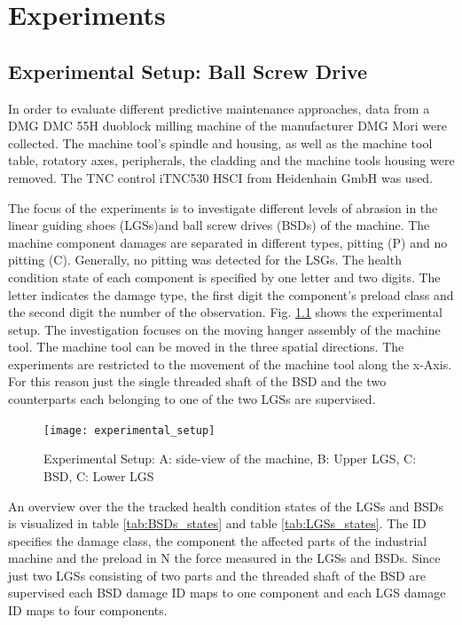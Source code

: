 \chapter{Experiments}\label{chapter:experiments}




\section{Experimental Setup: Ball Screw Drive}
In order to evaluate different predictive maintenance approaches, data from a DMG DMC 55H duoblock milling machine of the manufacturer DMG Mori were collected. The machine tool’s spindle and housing, as well as the machine tool table, rotatory axes, peripherals, the cladding and the machine tools housing were removed. The TNC control iTNC530 HSCI from Heidenhain GmbH was used.

The focus of the experiments is to investigate different levels of abrasion in the linear guiding shoes (LGSs)and ball screw drives (BSDs) of the machine. The machine component damages are separated in different types, pitting (P) and no pitting (C). Generally, no pitting was detected for the LSGs. The health condition state of each component is specified by one letter and two digits. The letter indicates the damage type, the first digit the component’s preload class and the second digit the number of the observation. Fig. \ref{fig:experimental_setup} shows the experimental setup. The investigation focuses on the moving hanger assembly of the machine tool. The machine tool can be moved in the three spatial directions. The experiments are restricted to the movement of the machine tool along the x-Axis. For this reason just the single threaded shaft of the BSD and the two counterparts each belonging to one of the two LGSs are supervised.

\begin{figure}[htpb]
  \centering
  \texttt{[image: experimental\_setup]}
  \caption {Experimental Setup: A: side-view of the machine, B: Upper LGS, C: BSD, C: Lower LGS}
  \label{fig:experimental_setup}
\end{figure}
\FloatBarrier 


An overview over the the tracked health condition states of the LGSs and BSDs is visualized in table \ref {tab:BSDs_states} and table \ref {tab:LGSs_states}. The ID specifies the damage class, the component the affected parts of the industrial machine and the preload in N the force measured in the LGSs and BSDs. Since just two LGSs consisting of two parts and the threaded shaft of the BSD are supervised each BSD damage ID maps to one component and each LGS damage ID maps to four components. 



